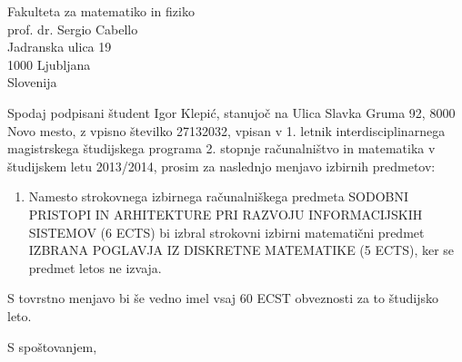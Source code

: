 \documentclass[a4paper]{scrlttr2}
\begin{document}
 
\begin{letter}{Fakulteta za matematiko in fiziko\\ prof. dr. Sergio Cabello \\ Jadranska ulica 19 \\ 1000 Ljubljana \\ Slovenija}
 

\opening{}
 
Spodaj podpisani študent Igor Klepić, stanujoč na Ulica Slavka Gruma 92, 8000 Novo mesto, z vpisno številko 27132032, vpisan v 1. letnik interdisciplinarnega magistrskega študijskega programa 2. stopnje računalništvo in matematika v študijskem letu 2013/2014, prosim za naslednjo menjavo izbirnih predmetov:
\begin{enumerate}
	\item Namesto strokovnega izbirnega računalniškega predmeta SODOBNI PRISTOPI IN ARHITEKTURE PRI RAZVOJU INFORMACIJSKIH SISTEMOV (6 ECTS) bi izbral strokovni izbirni matematični predmet IZBRANA POGLAVJA IZ DISKRETNE MATEMATIKE (5 ECTS), ker se predmet letos ne izvaja.
\end{enumerate}

S tovrstno menjavo bi še vedno imel vsaj 60 ECST obveznosti za to študijsko leto. 

\closing{S spoštovanjem,}




 
\end{letter}
 
\end{document}
